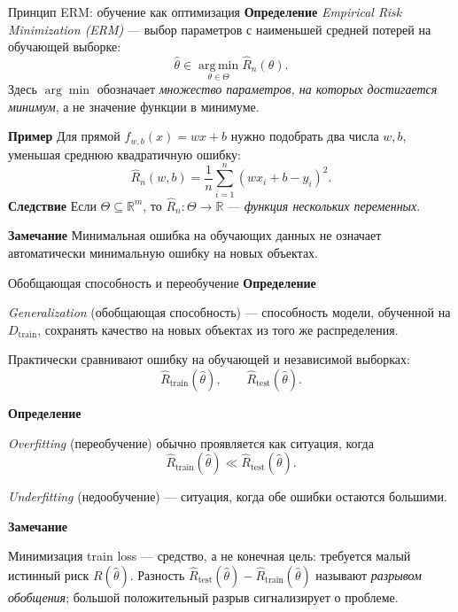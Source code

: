 \documentclass[10pt]{beamer}
\newcommand{\mlBody}{\normalsize}
\newcommand{\mlDefinition}{\textcolor{defblue}{\bfseries Определение}}
\newcommand{\mlRemark}{\textcolor{defblue}{\bfseries Замечание}}
\newcommand{\mlConsequence}{\textcolor{defblue}{\bfseries Следствие}}
\newcommand{\mlExample}{\textcolor{defblue}{\bfseries Пример}}
\begin{document}
\begin{frame}{Принцип ERM: обучение как оптимизация}
\mlBody
\mlDefinition\; \textit{Empirical Risk Minimization (ERM)} --- выбор
параметров с наименьшей средней потерей на обучающей выборке:
\[
 \boxed{\hat\theta\in\operatorname*{arg\,min}_{\theta\in\Theta}
 \widehat R_n(\theta)}.
\]
Здесь $\arg\min$ обозначает \emph{множество параметров, на которых
достигается минимум}, а не значение функции в минимуме.

\mlExample\; Для прямой $f_{w,b}(x)=wx+b$ нужно подобрать
два числа $w,b$, уменьшая среднюю квадратичную ошибку:
\[
 \widehat R_n(w,b)=\frac1n\sum_{i=1}^n(wx_i+b-y_i)^2.
\]
\mlConsequence\; Если $\Theta\subseteq\mathbb R^m$, то
$\widehat R_n:\Theta\to\mathbb R$ --- \emph{функция нескольких переменных}.

\mlRemark\; Минимальная ошибка на обучающих данных не означает
автоматически минимальную ошибку на новых объектах.
\end{frame}

\begin{frame}{Обобщающая способность и переобучение}
    \mlBody
    \mlDefinition

    \textit{Generalization} (обобщающая способность) --- способность модели,
    обученной на $D_{\mathrm{train}}$, сохранять качество на новых объектах
    из того же распределения.

    Практически сравнивают ошибку на обучающей и независимой выборках:
    \[
        \widehat R_{\mathrm{train}}(\hat\theta),
        \qquad
        \widehat R_{\mathrm{test}}(\hat\theta).
    \]

    \mlDefinition

    \textit{Overfitting} (переобучение) обычно проявляется как ситуация, когда
    \[
        \widehat R_{\mathrm{train}}(\hat\theta)
        \ll
        \widehat R_{\mathrm{test}}(\hat\theta).
    \]

    \textit{Underfitting} (недообучение) --- ситуация, когда
    обе ошибки остаются большими.

    \mlRemark

    Минимизация train loss --- средство, а не конечная цель:
    требуется малый истинный риск $R(\hat\theta)$.
    Разность $\widehat R_{\mathrm{test}}(\hat\theta)-
    \widehat R_{\mathrm{train}}(\hat\theta)$ называют \textit{разрывом обобщения};
    большой положительный разрыв сигнализирует о проблеме.
\end{frame}
\end{document}
